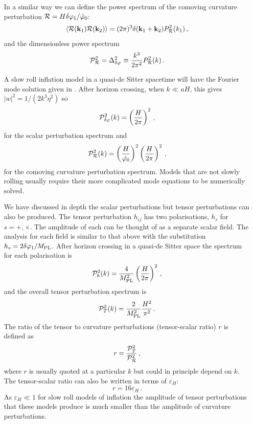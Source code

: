 In a similar way we can define the power spectrum of the comoving curvature
perturbation $\mathcal{R} = H\delta\varphi_{1}/\dot{\varphi}_0$:
% 
\begin{equation}
 \label{eq:Prdefn-intro}
 \langle \mathcal{R}(\textbf{k}_1) \mathcal{R}(\textbf{k}_2) \rangle 
   = (2\pi)^3 \delta(\textbf{k}_1 + \textbf{k}_2) P_{\mathcal{R}}^2 (k_1)\,,
\end{equation}
%
and the dimensionless power spectrum
% 
\begin{equation}
 \mathcal{P}_{\mathcal{R}}^2 = \Delta^2_{\delta\varphi_{}} \equiv \frac{k^3}{2\pi^2}
P_{\mathcal{R}}^2(k)\,.
\end{equation}

A slow roll inflation model in a quasi-de Sitter spacetime will have the
Fourier mode solution given in . 
After horizon crossing, when $k\ll aH$, this gives $|w|^2 = 1/(2k^3 \eta^2)$ so 
% 
\begin{equation}
\label{eq:pphi-intro}
 \mathcal{P}_{\delta\varphi_{}}^2(k) = \left(\frac{H}{2\pi}\right)^2 \,,
\end{equation}
% 
for the scalar perturbation spectrum and
% 
\begin{equation}
 \mathcal{P}_{\mathcal{R}}^2 (k) = \left(\frac{H}{\dot{\varphi_0}}\right)^2 \left(\frac{H}{2\pi}\right)^2\,,
\end{equation}
% 
for the comoving curvature perturbation spectrum. Models that are not
slowly rolling usually require their more complicated mode equations to be
numerically solved. 

We have discussed in depth the scalar perturbations but tensor perturbations
can also be produced. The tensor perturbation $h_{ij}$
has two polarisations, $h_s$ for $s=+, \times$. The amplitude of
each can be thought of as a separate scalar field. The analysis for each field
is similar to that above with the substitution $h_s= 2\delta\varphi_{1}/M_{\mathrm{PL}}$. After horizon
crossing in a quasi-de Sitter space the spectrum for each polarisation is
% 
\begin{equation}
 \mathcal{P}_h^2(k) = \frac{4}{M_{\mathrm{PL}}^2} \left(\frac{H}{2\pi}\right)^2\,,
\end{equation}
% 
and the overall tensor perturbation spectrum is
% 
\begin{equation}
 \label{eq:Ptdefn-intro}
\mathcal{P}_T^2(k) = \frac{2}{M_{\mathrm{PL}}^2} \frac{H^2}{\pi^2}\,.
\end{equation}
The ratio of the tensor to curvature perturbations (tensor-scalar ratio) $r$ is
defined as 
% 
\begin{equation}
 r = \frac{\mathcal{P}_T^2}{\mathcal{P}_{\mathcal{R}}^2 }\,,
\end{equation}
% 
where $r$ is usually quoted at a particular $k$ but could in principle depend
on $k$. The tensor-scalar ratio can also be written in terms of $\varepsilon_H$:
% 
\begin{equation}
\label{eq:rslowroll-intro}
 r = 16 \varepsilon_H\,.
\end{equation}
As $\varepsilon_H\ll1$ for slow roll models of inflation the amplitude of tensor
perturbations that these models produce is much smaller than the amplitude of
curvature perturbations. 


